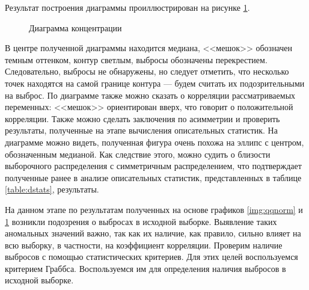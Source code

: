 Результат построения диаграммы проиллюстрирован на рисунке \ref{img:bagplot}.
\begin{figure}[ht]
\caption{Диаграмма концентрации}
\label{img:bagplot}
\end{figure}
В центре полученной диаграммы находится медиана, <<мешок>> обозначен темным оттенком, контур светлым, выбросы обозначены перекрестием. Следовательно, выбросы не обнаружены, но следует отметить, что несколько точек находятся на самой границе контура --- будем считать их подозрительными на выброс. По диаграмме также можно сказать о корреляции рассматриваемых переменных: <<мешок>> ориентирован вверх, что говорит о положительной корреляции. Также можно сделать заключения по асимметрии и проверить результаты, полученные на этапе вычисления описательных статистик. На диаграмме можно видеть, полученная фигура очень похожа на эллипс с центром, обозначенным медианой. Как следствие этого, можно судить о близости выборочного распределения с симметричным распределением, что подтверждает полученные ранее в анализе описательных статистик, представленных в таблице \ref{table:dstats}, результаты.

На данном этапе по результатам полученных на основе графиков \ref{img:qqnorm} и \ref{img:bagplot} возникли подозрения о выбросах в исходной выборке. Выявление таких аномальных значений важно, так как их наличие, как правило, сильно влияет на всю выборку, в частности, на коэффициент корреляции. Проверим наличие выбросов с помощью статистических критериев. Для этих целей воспользуемся критерием Граббса. Воспользуемся им для определения наличия выбросов в исходной выборке. 

